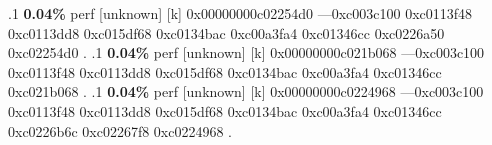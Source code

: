 \begin{profile}
{.1 \textbf{ 0.04\%} perf             [unknown]              [k] 0x00000000c02254d0\newline {} ---0xc003c100\newline {} 0xc0113f48\newline {} 0xc0113dd8\newline {} 0xc015df68\newline {} 0xc0134bac\newline {} 0xc00a3fa4\newline {} 0xc01346cc\newline {} 0xc0226a50\newline {} 0xc02254d0\newline {} . 
.1 \textbf{ 0.04\%} perf             [unknown]              [k] 0x00000000c021b068\newline {} ---0xc003c100\newline {} 0xc0113f48\newline {} 0xc0113dd8\newline {} 0xc015df68\newline {} 0xc0134bac\newline {} 0xc00a3fa4\newline {} 0xc01346cc\newline {} 0xc021b068\newline {} . 
.1 \textbf{ 0.04\%} perf             [unknown]              [k] 0x00000000c0224968\newline {} ---0xc003c100\newline {} 0xc0113f48\newline {} 0xc0113dd8\newline {} 0xc015df68\newline {} 0xc0134bac\newline {} 0xc00a3fa4\newline {} 0xc01346cc\newline {} 0xc0226b6c\newline {} 0xc02267f8\newline {} 0xc0224968\newline {} . 
}
\end{profile}
